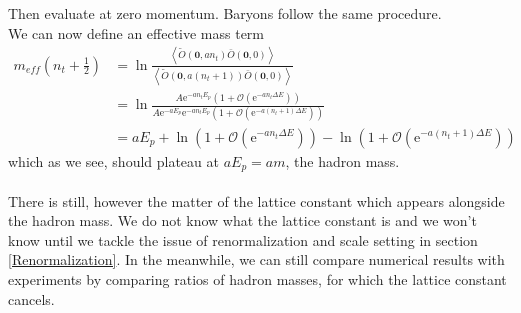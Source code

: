 \documentclass[a4paper,10pt]{book}
\begin{document}
Then evaluate at zero momentum. Baryons follow the same procedure.\\We can now define an effective mass term
\begin{equation}
\begin{aligned} 
m_{eff}(n_t+\frac{1}{2}) &= \operatorname{ln}\frac{\left\langle\widetilde{O}\left(\mathbf{0}, an_{t}\right) \bar{O}(\mathbf{0}, 0)\right\rangle}{\left\langle\widetilde{O}\left(\mathbf{0}, a(n_{t}+1)\right) \bar{O}(\mathbf{0}, 0)\right\rangle}\\ &= \operatorname{ln}\frac{A \mathrm{e}^{-a n_{t} E_p}\left(1+\mathcal{O}\left(\mathrm{e}^{-a n_{t} \Delta E}\right)\right)}{A \mathrm{e}^{-aE_p}\mathrm{e}^{-a n_{t} E_p}\left(1+\mathcal{O}\left(\mathrm{e}^{-a (n_{t}+1) \Delta E}\right)\right)}\\&=aE_p+\operatorname{ln} \left(1+\mathcal{O}\left(\mathrm{e}^{-a n_{t} \Delta E}\right)\right)- \operatorname{ln}\left(1+\mathcal{O}\left(\mathrm{e}^{-a (n_{t}+1) \Delta E}\right)\right)
\end{aligned}
\end{equation}
which as we see, should plateau at $aE_p = am$, the hadron mass.\\\\There is still, however the matter of the lattice constant which appears alongside the hadron mass. We do not know what the lattice constant is and we won't know until we tackle the issue of renormalization and scale setting in section \ref{Renormalization}. In the meanwhile, we can still compare numerical results with experiments by comparing ratios of hadron masses, for which the lattice constant cancels.
\end{document}

